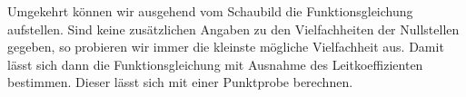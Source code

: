 \bigskip

\begin{minipage}{\textwidth}
\end{minipage}
\newpage
Umgekehrt können wir ausgehend vom Schaubild die Funktionsgleichung aufstellen. Sind keine zusätzlichen Angaben zu den Vielfachheiten der Nullstellen gegeben, so probieren wir immer die kleinste mögliche Vielfachheit aus. Damit lässt sich dann die Funktionsgleichung mit Ausnahme des Leitkoeffizienten bestimmen. Dieser lässt sich mit einer Punktprobe berechnen.

\bigskip

